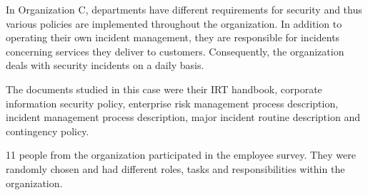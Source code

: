 In Organization C, departments have different requirements for security and thus various policies are implemented throughout the organization. In addition to operating their own incident management, they are responsible for incidents concerning services they deliver to customers. Consequently, the organization deals with security incidents on a daily basis. 

The documents studied in this case were their \ac{IRT} handbook, corporate information security policy, enterprise risk management process description, incident management process description, major incident routine description and contingency policy.

11 people from the organization participated in the employee survey. They were randomly chosen and had different roles, tasks and responsibilities within the organization.